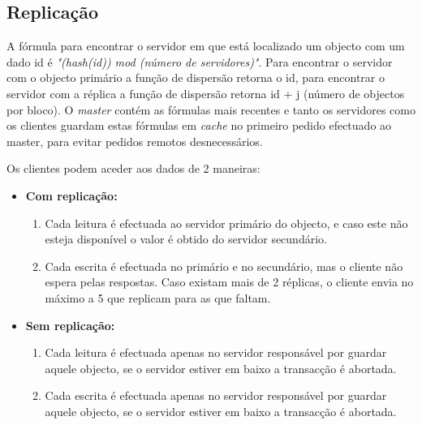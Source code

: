 \subsection{Replicação}

A fórmula para encontrar o servidor em que está localizado um objecto com um dado id é \textit{"(hash(id)) mod (número de servidores)"}. Para encontrar o servidor com o objecto primário a função de dispersão retorna o id, para encontrar o servidor com a réplica a função de dispersão retorna id + j (número de objectos por bloco).
O \textit{master} contém as fórmulas mais recentes e tanto os servidores como os clientes guardam estas fórmulas em \textit{cache} no primeiro pedido efectuado ao master, para evitar pedidos remotos desnecessários.

Os clientes podem aceder aos dados de 2 maneiras:

\begin{itemize}
\item \textbf{Com replicação:} 

\begin{enumerate}
\item Cada leitura é efectuada ao servidor primário do objecto, e caso este não esteja disponível o valor é obtido do servidor secundário.

\item Cada escrita é efectuada no primário e no secundário, mas o cliente não espera pelas respostas. Caso existam mais de 2 réplicas, o cliente envia no máximo a 5 que replicam para as que faltam.
\end{enumerate}

\item \textbf{Sem replicação:}

\begin{enumerate}
\item Cada leitura é efectuada apenas no servidor responsável por guardar aquele objecto, se o servidor estiver em baixo a transacção é abortada.

\item Cada escrita é efectuada apenas no servidor responsável por guardar aquele objecto, se o servidor estiver em baixo a transacção é abortada.
\end{enumerate}
\end{itemize}